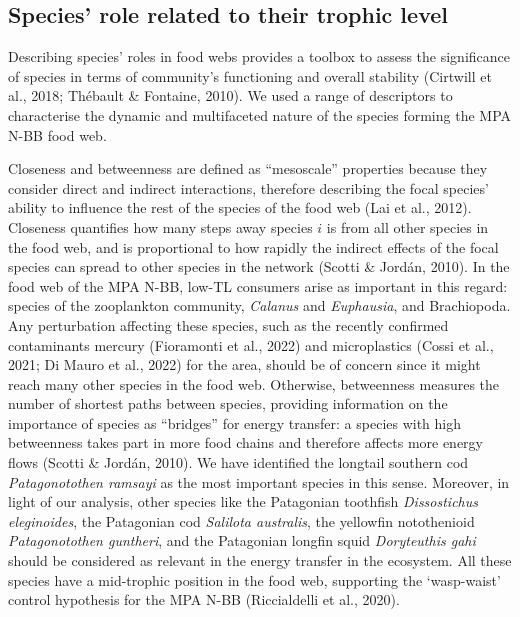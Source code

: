 \documentclass[preprint, 3p,
authoryear]{elsarticle} %
\begin{document}
\hypertarget{species-role-related-to-their-trophic-level}{%
\subsection{Species' role related to their trophic
level}\label{species-role-related-to-their-trophic-level}}

Describing species' roles in food webs provides a toolbox to assess the
significance of species in terms of community's functioning and overall
stability (Cirtwill et al., 2018; Thébault \& Fontaine, 2010). We used a
range of descriptors to characterise the dynamic and multifaceted nature
of the species forming the MPA N-BB food web.

Closeness and betweenness are defined as ``mesoscale'' properties
because they consider direct and indirect interactions, therefore
describing the focal species' ability to influence the rest of the
species of the food web (Lai et al., 2012). Closeness quantifies how
many steps away species \(i\) is from all other species in the food web,
and is proportional to how rapidly the indirect effects of the focal
species can spread to other species in the network (Scotti \& Jordán,
2010). In the food web of the MPA N-BB, low-TL consumers arise as
important in this regard: species of the zooplankton community,
\emph{Calanus} and \emph{Euphausia}, and Brachiopoda. Any perturbation
affecting these species, such as the recently confirmed contaminants
mercury (Fioramonti et al., 2022) and microplastics (Cossi et al., 2021;
Di Mauro et al., 2022) for the area, should be of concern since it might
reach many other species in the food web. Otherwise, betweenness
measures the number of shortest paths between species, providing
information on the importance of species as ``bridges'' for energy
transfer: a species with high betweenness takes part in more food chains
and therefore affects more energy flows (Scotti \& Jordán, 2010). We
have identified the longtail southern cod \emph{Patagonotothen ramsayi}
as the most important species in this sense. Moreover, in light of our
analysis, other species like the Patagonian toothfish \emph{Dissostichus
eleginoides}, the Patagonian cod \emph{Salilota australis}, the
yellowfin notothenioid \emph{Patagonotothen guntheri}, and the
Patagonian longfin squid \emph{Doryteuthis gahi} should be considered as
relevant in the energy transfer in the ecosystem. All these species have
a mid-trophic position in the food web, supporting the `wasp-waist'
control hypothesis for the MPA N-BB (Riccialdelli et al., 2020).
\end{document}
